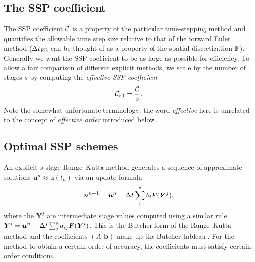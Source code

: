 \subsection{The SSP coefficient}

The SSP coefficient $\mathcal{C}$ is a property of the particular time-stepping method and quantifies the allowable time step size relative to that of the forward Euler method
($\Delta t_{\text{FE}}$ can be thought of as a property of the spatial discretization $\bm{F}$).
Generally we want the SSP coefficient to be as large as possible for efficiency.
To allow a fair comparison of different explicit methods, we scale by the number of stages $s$ by computing the \emph{effective SSP coefficient}
$$\mathcal{C}_{\text{eff}} = \frac{\mathcal{C}}{s}.$$
Note the somewhat unfortunate terminology: the word \emph{effective} here is unrelated to the concept of \emph{effective order} introduced below.


\subsection{Optimal SSP schemes}\label{subsec:Optimal_SSPRK}


An explicit $s$-stage Runge--Kutta method generates a sequence of approximate solutions $\bm{u}^n \approx \bm{u}(t_n)$ via an update formula
$$\bm{u}^{n+1} = \bm{u}^{n} + \Delta t \sum_i^s b_i \bm{F}(\bm{Y}^j),$$
where the $\bm{Y}^j$ are intermediate stage values computed using a similar rule
$\bm{Y}^{i} = \bm{u}^{n} + \Delta t \sum_j^s a_{ij} \bm{F}(\bm{Y}^i)$.
This is the Butcher form of the Runge--Kutta method and the coefficients $(A,\bm{b})$ make up the Butcher tableau \cite{Butcher2008_book}.
For the method to obtain a certain order of accuracy, the coefficients must satisfy certain order conditions.


